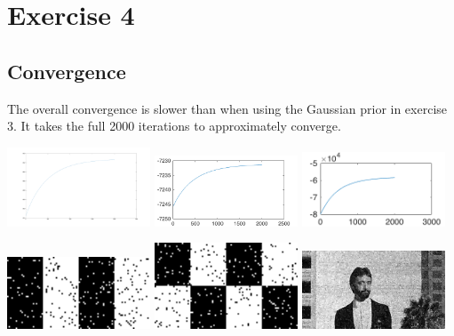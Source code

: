 \documentclass[a4paper,11pt, final]{scrartcl}
\begin{document}
\section*{Exercise 4}
\subsection*{Convergence}
The overall convergence is slower than when using the Gaussian prior in exercise 3. It takes the full 2000 iterations to approximately converge. 

{
\centering 
\includegraphics[width=0.32\textwidth]{ex4_stripes_mrf_student_posterior.png}
\includegraphics[width=0.32\textwidth]{ex4_checker_mrf_student_posterior.png}
\includegraphics[width=0.32\textwidth]{ex4_image_mrf_student_posterior.png}
}

\vspace{1cm}

{
\centering 
\includegraphics[width=0.32\textwidth]{ex4_stripes_mrf_student_filtered.png}
\includegraphics[width=0.32\textwidth]{ex4_checker_mrf_student_filtered.png}
\includegraphics[width=0.32\textwidth]{ex4_image_mrf_student_filtered.png}
}
\end{document}
